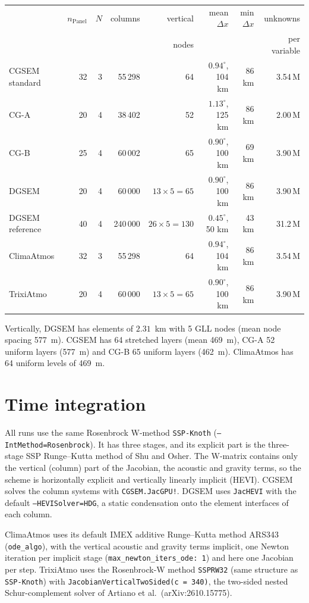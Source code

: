\documentclass[11pt,a4paper]{article}
\newcommand{\code}[1]{\texttt{#1}}
\begin{document}
\begin{center}
\small
\begin{tabular}{lrrrrrrr}
\toprule
 & $n_\text{Panel}$ & $N$ & columns & vertical & mean $\Delta x$ & min $\Delta x$ & unknowns \\
 &  &  &  & nodes & & & per variable \\
\midrule
CGSEM standard & 32 & 3 & 55\,298 & 64 & $0.94^\circ$, 104 km & 86 km & 3.54\,M \\
CG-A           & 20 & 4 & 38\,402 & 52 & $1.13^\circ$, 125 km & 86 km & 2.00\,M \\
CG-B           & 25 & 4 & 60\,002 & 65 & $0.90^\circ$, 100 km & 69 km & 3.90\,M \\
DGSEM          & 20 & 4 & 60\,000 & $13\times5=65$ & $0.90^\circ$, 100 km & 86 km & 3.90\,M \\
DGSEM reference& 40 & 4 & 240\,000 & $26\times5=130$ & $0.45^\circ$, 50 km & 43 km & 31.2\,M \\
ClimaAtmos     & 32 & 3 & 55\,298 & 64 & $0.94^\circ$, 104 km & 86 km & 3.54\,M \\
TrixiAtmo      & 20 & 4 & 60\,000 & $13\times5=65$ & $0.90^\circ$, 100 km & 86 km & 3.90\,M \\
\bottomrule
\end{tabular}
\end{center}

Vertically, DGSEM has elements of $2.31$~km with 5 GLL nodes (mean node
spacing 577~m). CGSEM has 64 stretched layers (mean 469~m), CG-A 52
uniform layers (577~m) and CG-B 65 uniform layers (462~m). ClimaAtmos
has 64 uniform levels of 469~m.

\section{Time integration}

All runs use the same Rosenbrock W-method \code{SSP-Knoth}
(\code{--IntMethod=Rosenbrock}). It has three stages, and its explicit
part is the three-stage SSP Runge--Kutta method of Shu and Osher. The W-matrix
contains only the vertical (column) part of the Jacobian, the acoustic
and gravity terms, so the scheme is horizontally explicit and
vertically linearly implicit (HEVI). CGSEM solves the column systems
with \code{CGSEM.JacGPU!}. DGSEM uses \code{JacHEVI} with the default
\code{--HEVISolver=HDG}, a static condensation onto the element
interfaces of each column.

ClimaAtmos uses its default IMEX additive Runge--Kutta method ARS343
(\code{ode\_algo}), with the vertical acoustic and gravity terms
implicit, one Newton iteration per implicit stage
(\code{max\_newton\_iters\_ode: 1}) and here one Jacobian per step. TrixiAtmo uses the Rosenbrock-W
method \code{SSPRW32} (same structure as \code{SSP-Knoth}) with
\code{JacobianVerticalTwoSided(c = 340)}, the two-sided nested
Schur-complement solver of Artiano et al.\ (arXiv:2610.15775).
\end{document}
